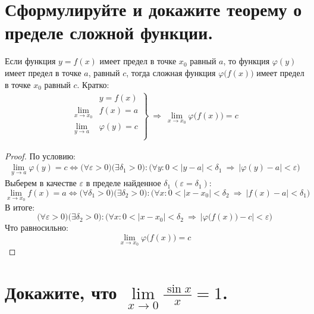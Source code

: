\section{Сформулируйте и докажите теорему о пределе сложной функции.}

\begin{theorem}
  Если функция $y = f(x)$ имеет предел в точке  $x_0$ равный $a$, то функция  $\varphi(y)$ имеет предел в точке $a$, равный $c$, тогда сложная функция  $\varphi\big(f(x)\big)$ имеет предел в точке $x_0$ равный $c$. Кратко: \vspace{-\topsep}
  \begin{gather*}
    \left. \begin{aligned}
      &y = f(x) \\
      \lim\limits_{x \to x_0} &f(x) = a \\
      \lim\limits_{y \to a}\ &\varphi(y) = c \\
    \end{aligned}\right\}\ \Rightarrow\ \lim\limits_{x \to x_0} \varphi\big(f(x)\big) = c
  \end{gather*}
\end{theorem}
\begin{proof}
  По условию: \vspace{-4pt}
  \begin{gather*}
    \lim_{y \to a} \varphi(y) = c \iff \big(\forall \varepsilon > 0\big)\big(\exists \delta_1 > 0\big)\colon \big(\forall y\colon 0 < |y-a| < \delta_1\ \Rightarrow\ |\varphi(y) - a| < \varepsilon\big) \tag{1}
  \end{gather*}
  Выберем в качестве $\varepsilon$ в пределе найденное $\delta_1\ (\varepsilon = \delta_1)$: \[
    \lim_{x \to x_0} f(x) = a \iff \big(\forall \delta_1 > 0\big) \big(\exists \delta_2 > 0\big)\colon \big(\forall x\colon 0 < |x - x_0| < \delta_2\ \Rightarrow\ |f(x) - a| < \delta_1\big) \tag{2} 
  \]
  В итоге: \vspace{-\topsep} \[
  \big(\forall \varepsilon > 0\big)\big(\exists \delta_2 > 0\big)\colon \big(\forall x\colon 0 < |x - x_0| < \delta_2\ \Rightarrow\ \left|\varphi\big(f(x)\big) - c\right| < \varepsilon\big)
  \] 
  Что равносильно: \vspace{-0.8\topsep} \[
  \lim\limits_{x \to x_0} \varphi\big(f(x)\big) = c
  \] 
\end{proof}

\section{Докажите, что $\lim\limits_{x \to 0}\frac{\sin x}{x} = 1$.}

